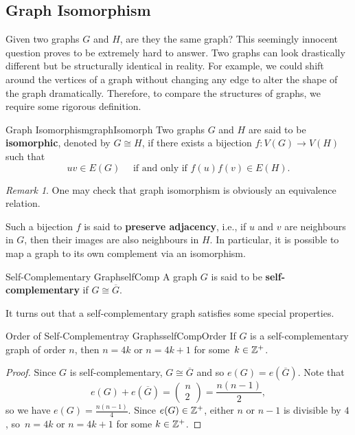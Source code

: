 \documentclass[math, code]{amznotes}
\theoremstyle{remark}
\newtheorem*{remark}{Remark}
\begin{document}
\subsection{Graph Isomorphism}
Given two graphs $G$ and $H$, are they the same graph? This seemingly innocent question proves to be extremely hard to answer. Two graphs can look drastically different but be structurally identical in reality. For example, we could shift around the vertices of a graph without changing any edge to alter the shape of the graph dramatically. Therefore, to compare the structures of graphs, we require some rigorous definition.
\begin{dfnbox}{Graph Isomorphism}{graphIsomorph}
    Two graphs $G$ and $H$ are said to be {\color{red} \textbf{isomorphic}}, denoted by $G \cong H$, if there exists a bijection $f \colon V(G) \to V(H)$ such that
    \begin{equation*}
        uv \in E(G) \quad\textrm{ if and only if } f(u)f(v) \in E(H).
    \end{equation*}
\end{dfnbox}
\begin{notebox}
    \begin{remark}
        One may check that graph isomorphism is obviously an equivalence relation.
    \end{remark}
\end{notebox}
Such a bijection $f$ is said to \textbf{preserve adjacency}, i.e., if $u$ and $v$ are neighbours in $G$, then their images are also neighbours in $H$. In particular, it is possible to map a graph to its own complement via an isomorphism.
\begin{dfnbox}{Self-Complementary Graph}{selfComp}
    A graph $G$ is said to be {\color{red} \textbf{self-complementary}} if $G \cong \overline{G}$.
\end{dfnbox}
It turns out that a self-complementary graph satisfies some special properties.
\begin{probox}{Order of Self-Complementray Graphs}{selfCompOrder}
    If $G$ is a self-complementary graph of order $n$, then $n = 4k$ or $n = 4k + 1$ for some~$k \in \mathbb{Z}^+$.
    \tcblower
    \begin{proof}
        Since $G$ is self-complementary, $G \cong \overline{G}$ and so $e(G) = e\left(\overline{G}\right)$. Note that
        \begin{equation*}
            e(G) + e\left(\overline{G}\right) = \begin{pmatrix}
                n \\
                2
            \end{pmatrix} = \frac{n(n - 1)}{2},
        \end{equation*}
        so we have $e(G) = \frac{n(n - 1)}{4}$. Since $e(G) \in \mathbb{Z}^+$, either $n$ or $n - 1$ is divisible by $4$, so~$n = 4k$ or $n = 4k + 1$ for some $k \in \mathbb{Z}^+$.
    \end{proof}
\end{probox}
\end{document}
